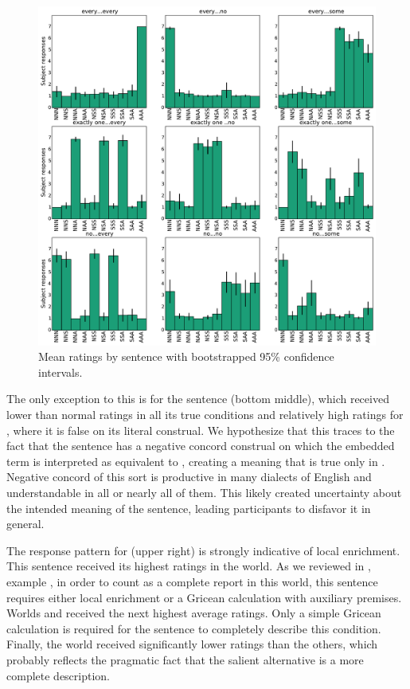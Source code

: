 \documentclass[leqno]{article}
\begin{document}
\begin{figure}[!ht]
  \centering
  \includegraphics[width=1\textwidth]{fig/basketball-pilot-2-11-14-results-parsed}
  \caption{Mean ratings by sentence with bootstrapped 95\% confidence intervals.}
  \label{fig:exp1-results}
\end{figure}

The only exception to this is for the sentence  (bottom middle), which received lower than normal
ratings in all its true conditions and relatively high ratings for
, where it is false on its literal construal. We
hypothesize that this traces to the fact that the sentence has a
negative concord construal on which the embedded term is interpreted
as equivalent to , creating a meaning that is
true only in . Negative concord of this sort is productive
in many dialects of English and understandable in all or nearly all of
them. This likely created uncertainty about the intended meaning of
the sentence, leading participants to disfavor it in general.

The response pattern for  (upper right) is
strongly indicative of local enrichment. This sentence received its
highest ratings in the  world. As we reviewed in
, example , in order to
count as a complete report in this world, this sentence requires
either local enrichment or a Gricean calculation with auxiliary
premises. Worlds  and  received the next highest
average ratings. Only a simple Gricean calculation is required for the
sentence to completely describe this condition. Finally, the
 world received significantly lower ratings than the
others, which probably reflects the pragmatic fact that the salient
alternative  is a more
complete description.
\end{document}

